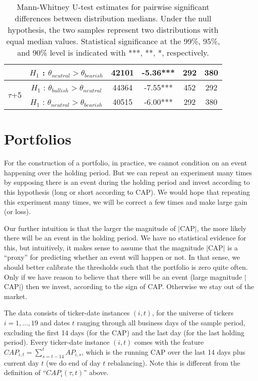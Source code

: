 \begin{table}[]
\begin{tabular}{|c|c|c|c|c|c|}
                                           & $H_1$ : $\theta_{neutral} > \theta_{bearish}$  & 42101 & -5.36*** & 292  & 380  \\ \hline
\multirow{2}{*}{$\tau$+5}                       & $H_1$ : $\theta_{bullish} > \theta_{neutral}$ & 44364 & -7.55*** & 452  & 292  \\
                                           & $H_1$ : $\theta_{neutral} > \theta_{bearish}$  & 40515 & -6.00*** & 292  & 380  \\ \hline
\end{tabular}
\caption{Mann-Whitney U-test estimates for pairwise significant differences between distribution medians. Under the null hypothesis, the two samples represent two distributions with equal median values. Statistical significance at the 99\%, 95\%, and 90\% level is indicated with ***, **, *, respectively.}
\label{utest_res}
\end{table}

\section{Portfolios} \label{S:portfolios}

For the construction of a portfolio, in practice, we cannot condition on an event happening over the holding period. But we can repeat an experiment many times by supposing there is an event during the holding period and invest according to this hypothesis (long or short according to CAP). We would hope that repeating this experiment many times, we will be correct a few times and make large gain (or loss).

Our further intuition is that the larger the magnitude of $\mid$CAP$\mid$, the more likely there will be an event in the holding period. We have no statistical evidence for this, but intuitively, it makes sense to assume that the magnitude $\mid$CAP$\mid$ is a  “proxy” for predicting whether an event will happen or not. In that sense, we should better calibrate the thresholds such that the portfolio is zero quite often. Only if we have reason to believe that there will be an event (large magnitude $\mid$CAP$\mid$) then we invest, according to the sign of CAP. Otherwise we stay out of the market.

The data consists of ticker-date instances $(i,t)$, for the universe of tickers $i=1,\dots,19$ and dates $t$ ranging through all business days of the sample period, excluding the first 14 days (for the CAP) and the last day (for the last holding period). Every ticker-date instance $(i,t)$ comes with the feature $CAP_{i,t}=\sum_{s=t-14}^t AP_{i,s}$, which is the running CAP over the last 14 days plus current day $t$ (we do end of day $t$ rebalancing). Note this is different from the definition of ``$CAP_i(\tau,t)$'' above.
    
